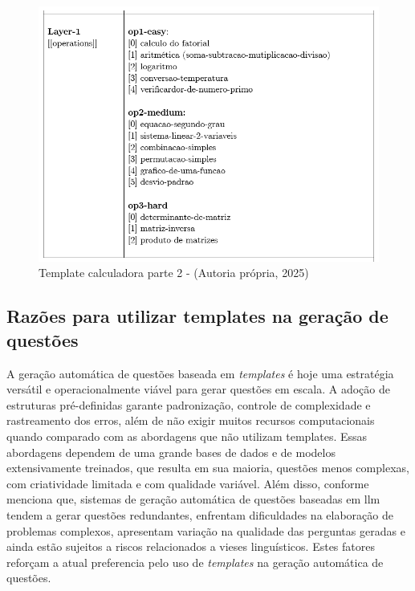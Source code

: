 \begin{figure}
    \centering
    \includegraphics[width=12cm]{./imagens/capitulo4/template-2.png}
    \caption{Template calculadora parte 2 - (Autoria própria, 2025)}
    \label{fig:template-2}
\end{figure}


\subsection{Razões para utilizar templates na geração de questões}

A geração automática de questões baseada em \textit{templates} é hoje uma estratégia versátil e operacionalmente viável para gerar questões em escala. A adoção de estruturas pré-definidas garante padronização, controle de complexidade e rastreamento dos erros, além de não exigir muitos recursos computacionais quando comparado com  as abordagens que não utilizam templates. Essas abordagens dependem de uma grande bases de dados e de modelos extensivamente treinados, que resulta em sua maioria, questões menos complexas, com criatividade limitada e com qualidade variável. Além disso, conforme \parencite{maity2024} menciona que, sistemas de geração automática de questões  baseadas em \gls{llm} tendem a gerar questões redundantes, enfrentam dificuldades na elaboração de problemas complexos, apresentam variação na qualidade das perguntas geradas e ainda estão sujeitos a riscos relacionados a vieses linguísticos. Estes fatores reforçam a atual preferencia pelo uso de \textit{templates} na geração automática de questões.